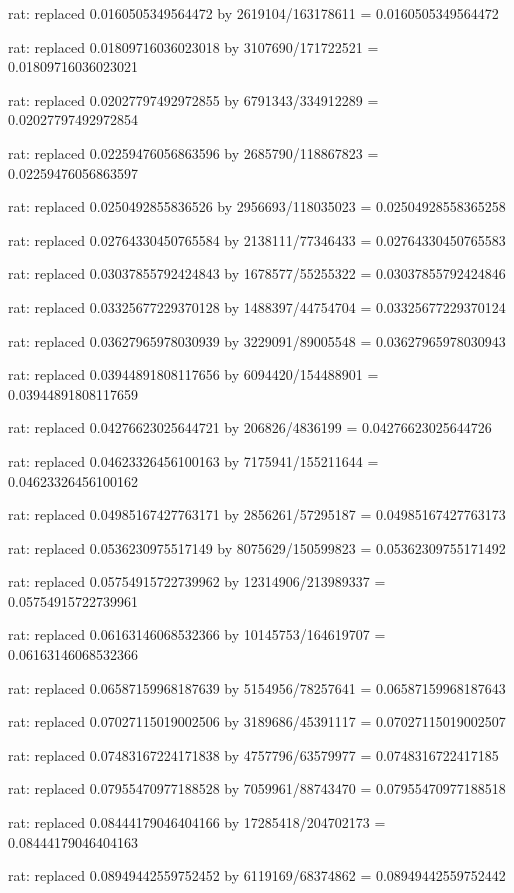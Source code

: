 \documentclass[a4paper,10pt]{article}
\begin{document}
\begin{eulernotebook}
\begin{eulercomment}
\begin{eulercomment}
\begin{eulercomment}
\begin{eulercomment}
\begin{eulercomment}
\begin{eulercomment}
\begin{eulercomment}
\begin{eulercomment}
\begin{eulercomment}
\begin{eulercomment}
\begin{eulercomment}
\begin{eulercomment}
\begin{eulercomment}
\begin{eulercomment}
\begin{eulercomment}
\begin{eulercomment}
\begin{euleroutput}
  rat: replaced 0.0160505349564472 by 2619104/163178611 = 0.0160505349564472
  
  rat: replaced 0.01809716036023018 by 3107690/171722521 = 0.01809716036023021
  
  rat: replaced 0.02027797492972855 by 6791343/334912289 = 0.02027797492972854
  
  rat: replaced 0.02259476056863596 by 2685790/118867823 = 0.02259476056863597
  
  rat: replaced 0.0250492855836526 by 2956693/118035023 = 0.02504928558365258
  
  rat: replaced 0.02764330450765584 by 2138111/77346433 = 0.02764330450765583
  
  rat: replaced 0.03037855792424843 by 1678577/55255322 = 0.03037855792424846
  
  rat: replaced 0.03325677229370128 by 1488397/44754704 = 0.03325677229370124
  
  rat: replaced 0.03627965978030939 by 3229091/89005548 = 0.03627965978030943
  
  rat: replaced 0.03944891808117656 by 6094420/154488901 = 0.03944891808117659
  
  rat: replaced 0.04276623025644721 by 206826/4836199 = 0.04276623025644726
  
  rat: replaced 0.04623326456100163 by 7175941/155211644 = 0.04623326456100162
  
  rat: replaced 0.04985167427763171 by 2856261/57295187 = 0.04985167427763173
  
  rat: replaced 0.0536230975517149 by 8075629/150599823 = 0.05362309755171492
  
  rat: replaced 0.05754915722739962 by 12314906/213989337 = 0.05754915722739961
  
  rat: replaced 0.06163146068532366 by 10145753/164619707 = 0.06163146068532366
  
  rat: replaced 0.06587159968187639 by 5154956/78257641 = 0.06587159968187643
  
  rat: replaced 0.07027115019002506 by 3189686/45391117 = 0.07027115019002507
  
  rat: replaced 0.07483167224171838 by 4757796/63579977 = 0.0748316722417185
  
  rat: replaced 0.07955470977188528 by 7059961/88743470 = 0.07955470977188518
  
  rat: replaced 0.08444179046404166 by 17285418/204702173 = 0.08444179046404163
  
  rat: replaced 0.08949442559752452 by 6119169/68374862 = 0.08949442559752442
  

\end{euleroutput}
\end{eulercomment}
\end{eulercomment}
\end{eulercomment}
\end{eulercomment}
\end{eulercomment}
\end{eulercomment}
\end{eulercomment}
\end{eulercomment}
\end{eulercomment}
\end{eulercomment}
\end{eulercomment}
\end{eulercomment}
\end{eulercomment}
\end{eulercomment}
\end{eulercomment}
\end{eulercomment}
\end{eulernotebook}
\end{document}
